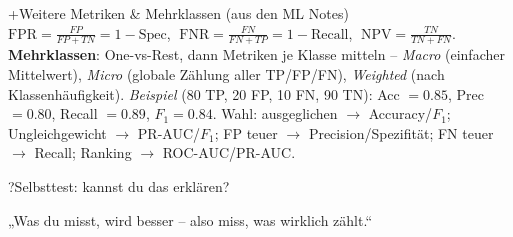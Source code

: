 \begin{hngrid}
%
\begin{hnp}[raster multicolumn=6,acc=hnteal]{+}{Weitere Metriken \& Mehrklassen (aus den ML Notes)}
$\mathrm{FPR}=\frac{FP}{FP+TN}=1-\mathrm{Spec}$, $\;\mathrm{FNR}=\frac{FN}{FN+TP}=1-\mathrm{Recall}$, $\;\mathrm{NPV}=\frac{TN}{TN+FN}$. \textbf{Mehrklassen}: One-vs-Rest, dann Metriken je Klasse mitteln -- \emph{Macro} (einfacher Mittelwert), \emph{Micro} (globale Zählung aller TP/FP/FN), \emph{Weighted} (nach Klassenhäufigkeit). \emph{Beispiel} (80 TP, 20 FP, 10 FN, 90 TN): Acc $=0.85$, Prec $=0.80$, Recall $=0.89$, $F_1=0.84$. Wahl: ausgeglichen $\to$ Accuracy/$F_1$; Ungleichgewicht $\to$ PR-AUC/$F_1$; FP teuer $\to$ Precision/Spezifität; FN teuer $\to$ Recall; Ranking $\to$ ROC-AUC/PR-AUC.
\end{hnp}
%
\begin{hnp}[raster multicolumn=6,acc=hnpurple,colback=hnlilac!30]{?}{Selbsttest: kannst du das erklären?}
\end{hnp}
%
\begin{hnbanner}[raster multicolumn=6]
„Was du misst, wird besser -- also miss, was wirklich zählt.“
\end{hnbanner}
\end{hngrid}
